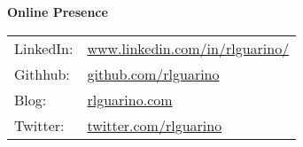 \documentclass[letterpaper,11pt]{article}
\newcommand{\resheading}[1]{{\large \colorbox{mygrey}{\begin{minipage}{\textwidth}{\textbf{#1 \vphantom{p\^{E}}}}\end{minipage}}}}
\begin{document}
\resheading{Online Presence}
{
  \begin{tabularx}{2in}{XX}
    LinkedIn: & \href{http://www.linkedin.com/in/rlguarino/}{www.linkedin.com/in/rlguarino/} \\
    Githhub: & \href{http://www.github.com/rlguarino}{github.com/rlguarino} \\
    Blog: & \href{http://www.rlguarino.com/}{rlguarino.com} \\
    Twitter: & \href{https://twitter.com/rlguarino}{twitter.com/rlguarino} \\
  \end{tabularx}
}
\pagebreak

\end{document}
